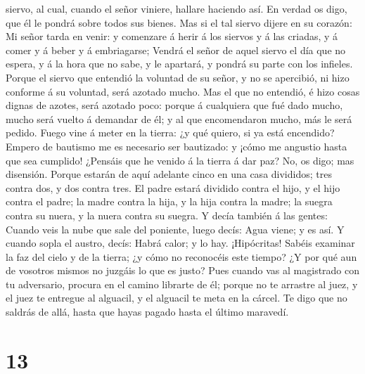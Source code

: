 siervo, al cual, cuando el señor viniere, hallare haciendo así.
 En verdad os digo, que él le pondrá sobre todos sus
bienes.  Mas si el tal siervo dijere en su corazón: Mi
señor tarda en venir: y comenzare á herir á los siervos y á las criadas,
y á comer y á beber y á embriagarse;  Vendrá el señor de
aquel siervo el día que no espera, y á la hora que no sabe, y le
apartará, y pondrá su parte con los infieles.  Porque el
siervo que entendió la voluntad de su señor, y no se apercibió, ni hizo
conforme á su voluntad, será azotado mucho.  Mas el que no
entendió, é hizo cosas dignas de azotes, será azotado poco: porque á
cualquiera que fué dado mucho, mucho será vuelto á demandar de él; y al
que encomendaron mucho, más le será pedido.  Fuego vine á
meter en la tierra: ¿y qué quiero, si ya está encendido? 
Empero de bautismo me es necesario ser bautizado: y ¡cómo me angustio
hasta que sea cumplido!  ¿Pensáis que he venido á la tierra
á dar paz? No, os digo; mas disensión.  Porque estarán de
aquí adelante cinco en una casa divididos; tres contra dos, y dos contra
tres.  El padre estará dividido contra el hijo, y el hijo
contra el padre; la madre contra la hija, y la hija contra la madre; la
suegra contra su nuera, y la nuera contra su suegra.  Y
decía también á las gentes: Cuando veis la nube que sale del poniente,
luego decís: Agua viene; y es así.  Y cuando sopla el
austro, decís: Habrá calor; y lo hay.  ¡Hipócritas! Sabéis
examinar la faz del cielo y de la tierra; ¿y cómo no reconocéis este
tiempo?  ¿Y por qué aun de vosotros mismos no juzgáis lo
que es justo?  Pues cuando vas al magistrado con tu
adversario, procura en el camino librarte de él; porque no te arrastre
al juez, y el juez te entregue al alguacil, y el alguacil te meta en la
cárcel.  Te digo que no saldrás de allá, hasta que hayas
pagado hasta el último maravedí.

\hypertarget{section-12}{%
\section{13}\label{section-12}}

